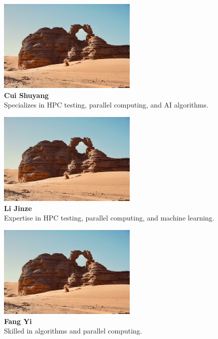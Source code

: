 \documentclass[a4paper,12pt]{article}
\begin{document}
\begin{table}[H]
\begin{center}
\begin{minipage}{0.45\textwidth}
    \centering
    \includegraphics[width=0.5\textwidth]{Cui_Shuyang.png}\\[0.3cm]
    \textbf{Cui Shuyang}\\[0.3cm]
    \small{Specializes in HPC testing, parallel computing, and AI algorithms.}
\end{minipage}
\begin{minipage}{0.45\textwidth}
    \centering
    \includegraphics[width=0.5\textwidth]{Li_Jinze.png}\\[0.3cm]
    \textbf{Li Jinze}\\[0.3cm]
    \small{Expertise in HPC testing, parallel computing, and machine learning.}
\end{minipage}

\vspace{1cm}

\begin{minipage}{0.45\textwidth}
    \centering
    \includegraphics[width=0.5\textwidth]{Fang_Yi.png}\\[0.3cm]
    \textbf{Fang Yi}\\[0.3cm]
    \small{Skilled in algorithms and parallel computing.}
\end{minipage}
\end{center}
\end{table}
\end{document}

